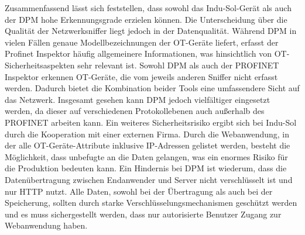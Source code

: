 \bigskip
\noindent Zusammenfassend lässt sich feststellen, dass sowohl das Indu-Sol-Gerät als auch der DPM hohe Erkennungsgrade erzielen können. Die Unterscheidung über die Qualität der Netzwerksniffer liegt jedoch in der Datenqualität. Während DPM in vielen Fällen genaue Modellbezeichnungen der OT-Geräte liefert, erfasst der Profinet Inspektor häufig allgemeinere Informationen, was hinsichtlich von OT-Sicherheitsaspekten sehr relevant ist. Sowohl DPM als auch der PROFINET Inspektor erkennen OT-Geräte, die vom jeweils anderen Sniffer nicht erfasst werden. Dadurch bietet die Kombination beider Tools eine umfassendere Sicht auf das Netzwerk. Insgesamt gesehen kann DPM jedoch vielfältiger eingesetzt werden, da dieser auf verschiedenen Protokollebenen auch außerhalb des PROFINET arbeiten kann. Ein weiteres Sicherheitsrisiko ergibt sich bei Indu-Sol durch die Kooperation mit einer externen Firma. Durch die Webanwendung, in der alle OT-Geräte-Attribute inklusive IP-Adressen gelistet werden, besteht die Möglichkeit, dass unbefugte an die Daten gelangen, was ein enormes Risiko für die Produktion bedeuten kann. Ein Hindernis bei DPM ist wiederum, dass die Datenübertragung zwischen Endanwender und Server nicht verschlüsselt ist und nur HTTP nutzt. Alle Daten, sowohl bei der Übertragung als auch bei der Speicherung, sollten durch starke Verschlüsselungsmechanismen geschützt werden und es muss sichergestellt werden, dass nur autorisierte Benutzer Zugang zur Webanwendung haben.





